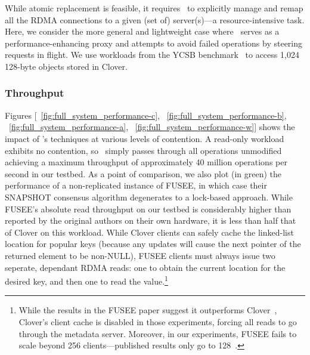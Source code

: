 While atomic replacement is feasible, it requires \sword\ to
explicitly manage and remap all the RDMA connections to a given (set
of) server(s)---a resource-intensive task.  Here, we consider the more
general and lightweight case where \sword\ serves as a
performance-enhancing proxy and attempts to avoid failed operations by
steering requests in flight.  We use workloads from the YCSB
benchmark~\cite{ycsb} to access 1,024 128-byte objects stored in Clover.  

\subsubsection{Throughput}

Figures [~\ref{fig:full_system_performance-c}, ~\ref{fig:full_system_performance-b}, ~\ref{fig:full_system_performance-a}, ~\ref{fig:full_system_performance-w}] shows the impact of \sword's
techniques at various levels of contention.  A read-only workload
exhibits no contention, so \sword\ simply passes through all
operations unmodified achieving a maximum throughput of approximately
40 million operations per second in our testbed.  As a point of
comparison, we also plot (in green) the performance of a
non-replicated instance of FUSEE, in which case their SNAPSHOT consensus algorithm
degenerates to a lock-based approach.  While FUSEE's absolute read
throughput on our testbed is considerably higher than reported by the
original authors on their own hardware, it is less than half that of
Clover on this workload.  While Clover clients can safely cache the
linked-list location for popular keys (because any updates will cause
the next pointer of the returned element to be non-NULL), FUSEE
clients must always issue two seperate, dependant RDMA reads: one to
obtain the current location for the desired key, and then one to read
the value.\footnote{While
the results in the FUSEE paper suggest it outperforms
Clover~\cite[Figs. 13--15]{fusee}, Clover's
client cache is disabled in those experiments, forcing all reads to go through the metadata server.  Moreover, in our experiments, FUSEE fails to scale beyond 256 clients---published results only go to 128~\cite{fusee}.}

